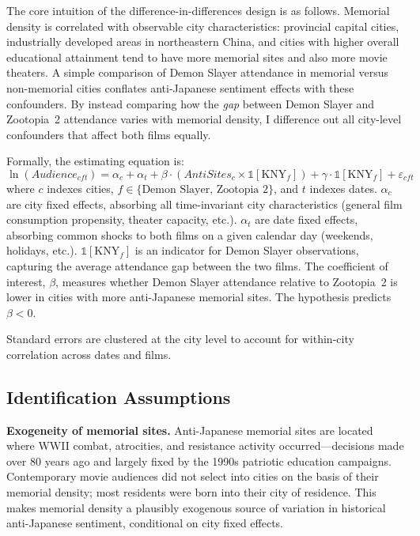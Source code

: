 \documentclass[12pt]{article}
\begin{document}
The core intuition of the difference-in-differences design is as follows. Memorial density is correlated with observable city characteristics: provincial capital cities, industrially developed areas in northeastern China, and cities with higher overall educational attainment tend to have more memorial sites and also more movie theaters. A simple comparison of Demon Slayer attendance in memorial versus non-memorial cities conflates anti-Japanese sentiment effects with these confounders. By instead comparing how the \textit{gap} between Demon Slayer and Zootopia~2 attendance varies with memorial density, I difference out all city-level confounders that affect both films equally.

Formally, the estimating equation is:
\begin{equation}
\ln(\textit{Audience}_{cft}) = \alpha_c + \alpha_t + \beta \cdot (\textit{AntiSites}_c \times \mathbb{1}[\text{KNY}_{f}]) + \gamma \cdot \mathbb{1}[\text{KNY}_{f}] + \varepsilon_{cft}
\label{eq:main}
\end{equation}
where $c$ indexes cities, $f \in \{\text{Demon Slayer, Zootopia~2}\}$, and $t$ indexes dates. $\alpha_c$ are city fixed effects, absorbing all time-invariant city characteristics (general film consumption propensity, theater capacity, etc.). $\alpha_t$ are date fixed effects, absorbing common shocks to both films on a given calendar day (weekends, holidays, etc.). $\mathbb{1}[\text{KNY}_{f}]$ is an indicator for Demon Slayer observations, capturing the average attendance gap between the two films. The coefficient of interest, $\beta$, measures whether Demon Slayer attendance relative to Zootopia~2 is lower in cities with more anti-Japanese memorial sites. The hypothesis predicts $\beta < 0$.

Standard errors are clustered at the city level to account for within-city correlation across dates and films.

\subsection{Identification Assumptions}

\textbf{Exogeneity of memorial sites.} Anti-Japanese memorial sites are located where WWII combat, atrocities, and resistance activity occurred---decisions made over 80 years ago and largely fixed by the 1990s patriotic education campaigns. Contemporary movie audiences did not select into cities on the basis of their memorial density; most residents were born into their city of residence. This makes memorial density a plausibly exogenous source of variation in historical anti-Japanese sentiment, conditional on city fixed effects.
\end{document}

